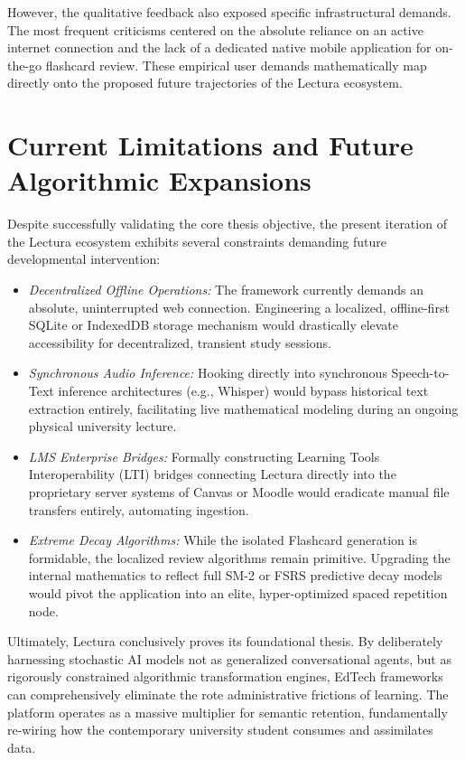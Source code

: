 However, the qualitative feedback also exposed specific infrastructural demands. The most frequent criticisms centered on the absolute reliance on an active internet connection and the lack of a dedicated native mobile application for on-the-go flashcard review. These empirical user demands mathematically map directly onto the proposed future trajectories of the Lectura ecosystem.

\section{Current Limitations and Future Algorithmic Expansions}
Despite successfully validating the core thesis objective, the present iteration of the Lectura ecosystem exhibits several constraints demanding future developmental intervention:

\begin{itemize}[label=\textendash]
    \item \textit{Decentralized Offline Operations:} The framework currently demands an absolute, uninterrupted web connection. Engineering a localized, offline-first SQLite or IndexedDB storage mechanism would drastically elevate accessibility for decentralized, transient study sessions.
    \item \textit{Synchronous Audio Inference:} Hooking directly into synchronous Speech-to-Text inference architectures (e.g., Whisper) would bypass historical text extraction entirely, facilitating live mathematical modeling during an ongoing physical university lecture.
    \item \textit{LMS Enterprise Bridges:} Formally constructing Learning Tools Interoperability (LTI) bridges connecting Lectura directly into the proprietary server systems of Canvas or Moodle would eradicate manual file transfers entirely, automating ingestion.
    \item \textit{Extreme Decay Algorithms:} While the isolated Flashcard generation is formidable, the localized review algorithms remain primitive. Upgrading the internal mathematics to reflect full SM-2 or FSRS predictive decay models would pivot the application into an elite, hyper-optimized spaced repetition node.
\end{itemize}

Ultimately, Lectura conclusively proves its foundational thesis. By deliberately harnessing stochastic AI models not as generalized conversational agents, but as rigorously constrained algorithmic transformation engines, EdTech frameworks can comprehensively eliminate the rote administrative frictions of learning. The platform operates as a massive multiplier for semantic retention, fundamentally re-wiring how the contemporary university student consumes and assimilates data.